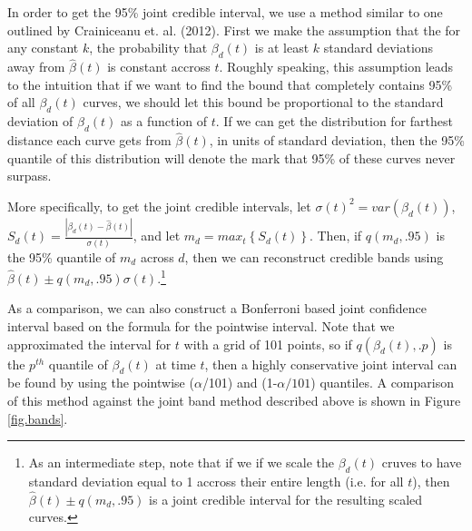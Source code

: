 \documentclass[12pt]{article}
\begin{document}
In order to get the 95\% joint credible interval, we use a method similar to one outlined by Crainiceanu et. al. (2012).\cite{crainiceanu2012bootstrap} First we make the assumption that the for any constant $k$, the probability that $\beta_d(t)$ is at least $k$ standard deviations away from $\hat{\beta}(t)$ is constant accross $t$. Roughly speaking, this assumption leads to the intuition that if we want to find the bound that completely contains 95\% of all $\beta_d(t)$ curves, we should let this bound be proportional to the standard deviation of $\beta_d(t)$ as a function of $t$. If we can get the distribution for farthest distance each curve gets from $\hat{\beta}(t)$, in units of standard deviation, then the 95\% quantile of this distribution will denote the mark that 95\% of these curves never surpass.

More specifically, to get the joint credible intervals, let $\sigma(t)^2 = var(\beta_d(t))$, $S_d(t) = \frac{|\beta_d(t)-\hat{\beta}(t)    | } {\sigma(t)}$, and let $m_d= max_t \left\lbrace S_d(t) \right\rbrace$. Then, if $q(m_d,.95)$ is the 95\% quantile of $m_d$ across $d$, then we can reconstruct credible bands using $\hat{\beta}(t) \pm  q(m_d,.95)\sigma(t)$.\footnote{As an intermediate step, note that if we  if we scale the $\beta_d(t)$ cruves to have standard deviation equal to 1 accross their entire length (i.e. for all $t$), then $\hat{\beta}(t) \pm q(m_d,.95)$ is a joint credible interval for the resulting scaled curves.}

As a comparison, we can also construct a Bonferroni based joint confidence interval based on the formula for the pointwise interval. Note that we approximated the interval for $t$ with a grid of 101 points, so if $q(\beta_d(t), .p)$ is the $p^{th}$ quantile of $\beta_d(t)$ at time $t$, then a highly conservative joint interval can be found by using the pointwise ($\alpha$/101) and (1-$\alpha/101$) quantiles. A comparison of this method against the joint band method described above is shown in Figure \ref{fig.bands}. 
\end{document}
